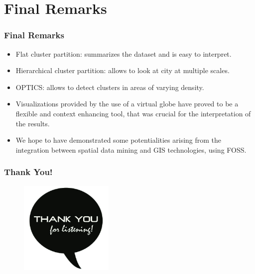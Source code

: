 \documentclass[hyperref={pdfpagelabels=true}]{beamer}
\begin{document}
\section{Final Remarks}
\begin{frame}
\frametitle{Final Remarks}
    \begin{itemize}    
      \item<2->Flat cluster partition: summarizes the dataset and is easy to interpret.
      \item<3->Hierarchical cluster partition: allows to look at city at multiple scales.%
      \item<4->OPTICS: allows to detect clusters in areas of varying density.%
      \item<5->Visualizations provided by the use of a virtual globe have proved to be a flexible and context enhancing tool, that was crucial for the interpretation of the results.
      \item<6->We hope to have demonstrated some potentialities arising from the integration between spatial data mining and GIS technologies, using FOSS.   
     \end{itemize}
\end{frame}

\begin{frame}
\frametitle{Thank You!}
    \begin{figure}   
      \includegraphics[width=0.4\textwidth]{thanks.jpg}      
    \end{figure}   
\end{frame}
\end{document}

